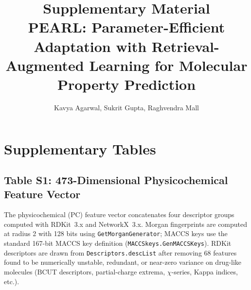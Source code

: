 \documentclass[9pt,a4paper]{article}
\title{\textbf{Supplementary Material}\\[4pt]
{\large PEARL: Parameter-Efficient Adaptation with
Retrieval-Augmented Learning for Molecular Property Prediction}}
\author{Kavya Agarwal, Sukrit Gupta, Raghvendra Mall}
\date{}
\begin{document}
\maketitle
\tableofcontents
\newpage

\section*{Supplementary Tables}

\subsection*{Table S1: 473-Dimensional Physicochemical Feature Vector}

The physicochemical (PC) feature vector concatenates four descriptor groups computed
with RDKit~3.x and NetworkX~3.x.
Morgan fingerprints are computed at radius 2 with 128 bits using
\texttt{GetMorganGenerator}; MACCS keys use the standard 167-bit MACCS key
definition (\texttt{MACCSkeys.GenMACCSKeys}).
RDKit descriptors are drawn from \texttt{Descriptors.descList} after removing
68 features found to be numerically unstable, redundant, or near-zero variance
on drug-like molecules (BCUT descriptors, partial-charge extrema, $\chi$-series,
Kappa indices, etc.).
\end{document}
